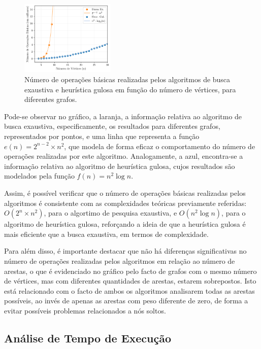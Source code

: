 \documentclass[mirror]{revdetua}
\begin{document}
\begin{figure}[h]
    \centering
    \includegraphics[width=0.4\textwidth]{../assets/numberOPS.png}
    \caption{Número de operações básicas realizadas pelos algoritmos de busca exaustiva e heurística gulosa em função do número de vértices, para diferentes grafos.}
    \label{fig:numeroops}
\end{figure}

Pode-se observar no gráfico, a laranja, a informação relativa ao algoritmo de busca exaustiva, especificamente, os resultados para diferentes grafos, representados por pontos, e uma linha que representa a função $e(n) = 2^{n-2} \times n^2$, que modela de forma eficaz o comportamento do número de operações realizadas por este algoritmo. Analogamente, a azul, encontra-se a informação relativa ao algoritmo de heurística gulosa, cujos resultados são modelados pela função $f(n) = n^2 \log n$.

Assim, é possível verificar que o número de operações básicas realizadas pelos algoritmos é consistente com as complexidades teóricas previamente referidas: $O(2^n \times n^2)$, para o algortimo de pesquisa exaustiva, e $O(n^2 \log n)$, para o algoritmo de heurística gulosa, reforçando a ideia de que a heurística gulosa é mais eficiente que a busca exaustiva, em termos de complexidade.

Para além disso, é importante destacar que não há diferenças significativas no número de operações realizadas pelos algoritmos em relação ao número de arestas, o que é evidenciado no gráfico pelo facto de grafos com o mesmo número de vértices, mas com diferentes quantidades de arestas, estarem sobrepostos. Isto está relacionado com o facto de ambos os algoritmos analisarem todas as arestas possíveis, ao invés de apenas as arestas com peso diferente de zero, de forma a evitar possíveis problemas relacionados a nós soltos.


\subsection{Análise de Tempo de Execução}
\end{document}
